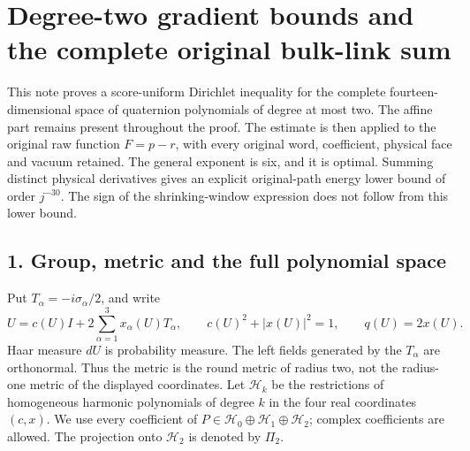\documentclass[11pt]{article}
\begin{document}
\section*{Degree-two gradient bounds and the complete original bulk-link sum}

This note proves a score-uniform Dirichlet inequality for the complete
fourteen-dimensional space of quaternion polynomials of degree at most two.
The affine part remains present throughout the proof. The estimate is then
applied to the original raw function \(F=p-r\), with every original word,
coefficient, physical face and vacuum retained. The general exponent is six,
and it is optimal. Summing distinct physical derivatives gives an explicit
original-path energy lower bound of order \(j^{-30}\). The sign of the
shrinking-window expression does not follow from this lower bound.

\subsection*{1. Group, metric and the full polynomial space}

Put \(T_\alpha=-i\sigma_\alpha/2\), and write
\[
 U=c(U)I+2\sum_{\alpha=1}^3x_\alpha(U)T_\alpha,\qquad
 c(U)^2+|x(U)|^2=1,\qquad q(U)=2x(U).
 \tag{PG1}
\]
Haar measure \(dU\) is probability measure. The left fields generated by
the \(T_\alpha\) are orthonormal. Thus the metric is the round metric of
radius two, not the radius-one metric of the displayed coordinates.
Let \(\mathcal H_k\) be the restrictions of homogeneous harmonic
polynomials of degree \(k\) in the four real coordinates \((c,x)\).
We use every coefficient of
\(P\in\mathcal H_0\oplus\mathcal H_1\oplus\mathcal H_2\);
complex coefficients are allowed. The projection onto \(\mathcal H_2\)
is denoted by \(\Pi_2\).
\end{document}
